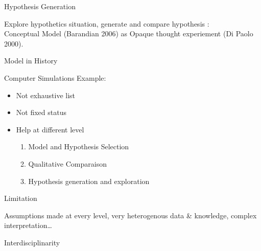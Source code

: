 \documentclass[12pt, notes=show,handout=no]{beamer}
\begin{document}
\begin{frame}{Hypothesis Generation}
    
    Explore hypothetics situation, generate and compare hypothesis :\\
    \vfill
    \hspace{.5cm}Conceptual Model (Barandian 2006) as Opaque thought experiement (Di Paolo 2000).
    \vfill

\end{frame}

\begin{frame}{Model in History}

    Computer Simulations Example:
    \begin{itemize}
	\item Not exhaustive list
	\item Not fixed status
	\item Help at different level
	    \begin{enumerate}
		\item Model and Hypothesis Selection
		\item Qualitative Comparaison
		\item Hypothesis generation and exploration
	    \end{enumerate}

    \end{itemize}
    

\end{frame}

\begin{frame}{Limitation}
    \begin{center}
	Assumptions made at every level, very heterogenous data \& knowledge, complex interpretation\dots
    \end{center}
\end{frame}

\begin{frame}
    \begin{center}
	\Huge
	Interdisciplinarity
    \end{center}
\end{frame}
\end{document}
